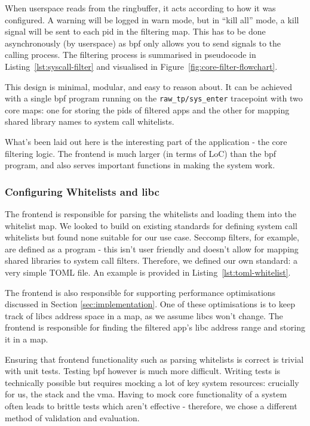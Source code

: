 When userspace reads  from the ringbuffer, it acts according to how it was
configured. A warning will be logged in warn mode, but in ``kill all'' mode, a
kill signal will be sent to each \ac{pid} in the filtering map. This has to be
done asynchronously (by userspace) as \ac{bpf} only allows you to send signals
to the calling process. The filtering process is summarised in pseudocode in
Listing~\ref{lst:syscall-filter} and visualised in 
Figure~\ref{fig:core-filter-flowchart}.

This design is minimal, modular, and easy to reason about. It can be achieved
with a single \ac{bpf} program running on the \texttt{raw\_tp/sys\_enter}
tracepoint with two core maps: one for storing the \acp{pid} of filtered apps
and the other for mapping shared library names to system call whitelists.

What's been laid out here is the interesting part of the application
- the core filtering logic. The frontend is much larger (in terms of LoC) than
the \ac{bpf} program, and also serves important functions in making the system
work.

\subsubsection{Configuring Whitelists and \ac{libc}}

The frontend is responsible for parsing the \af whitelists and loading them into
the whitelist map. We looked to build on existing standards for defining
system call whitelists but found none suitable for our use case. Seccomp filters,
for example, are defined as a  program - this isn't user friendly and
doesn't allow for mapping shared libraries to system call filters. Therefore, we defined our
own standard: a very simple TOML file. An example is provided in
Listing~\ref{lst:toml-whitelist}.

The frontend is also responsible for supporting performance optimisations
discussed in Section \ref{sec:implementation}. One of these optimisations is
to keep track of \acp{libc} address space in a map, as we assume \acp{libc} won't
change. The frontend is responsible for finding the filtered app's \ac{libc}
address range and storing it in a map.

Ensuring that frontend functionality such as parsing whitelists is correct is
trivial with unit tests. Testing \ac{bpf} however is much more difficult.
Writing tests is technically possible but requires mocking a lot of key system
resources: crucially for us, the stack and the \ac{vma}. Having to mock core
functionality of a system often leads to brittle tests which aren't effective -
therefore, we chose a different method of validation and evaluation.

